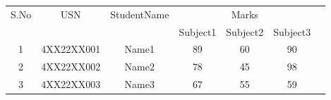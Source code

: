 \documentclass{article}
\begin{document}
\begin{tabular}{|c|c|c|c|c|c|c|}
\hline
S.No & USN & StudentName & \multicolumn{3}{c|}{Marks} \\
\cline{4-6}
 & & & Subject1 & Subject2 & Subject3 \\
\hline
1 & 4XX22XX001 & Name1 & 89 & 60 & 90 \\
\hline
2 & 4XX22XX002 & Name2 & 78 & 45 & 98 \\
\hline
3 & 4XX22XX003 & Name3 & 67 & 55 & 59 \\
\hline
\end{tabular}
\end{document}
